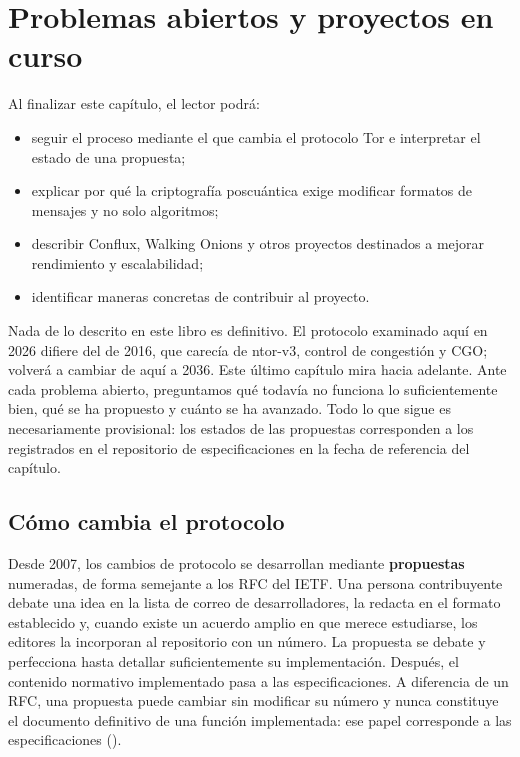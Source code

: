 \chapter{Problemas abiertos y proyectos en curso}\label{cap:31-futuro}

\begin{obiettivi}
Al finalizar este capítulo, el lector podrá:
\begin{itemize}[nosep]
  \item seguir el proceso mediante el que cambia el protocolo Tor e interpretar el estado de una propuesta;
  \item explicar por qué la criptografía poscuántica exige modificar formatos de mensajes y no solo algoritmos;
  \item describir Conflux, Walking Onions y otros proyectos destinados a mejorar rendimiento y escalabilidad;
  \item identificar maneras concretas de contribuir al proyecto.
\end{itemize}
\end{obiettivi}

Nada de lo descrito en este libro es definitivo. El protocolo examinado aquí en 2026 difiere del de 2016, que carecía de ntor-v3, control de congestión y CGO; volverá a cambiar de aquí a 2036. Este último capítulo mira hacia adelante. Ante cada problema abierto, preguntamos qué todavía no funciona lo suficientemente bien, qué se ha propuesto y cuánto se ha avanzado. Todo lo que sigue es necesariamente provisional: los estados de las propuestas corresponden a los registrados en el repositorio de especificaciones en la fecha de referencia del capítulo.

\section{Cómo cambia el protocolo}\label{sec:fut-processo}

Desde 2007, los cambios de protocolo se desarrollan mediante \textbf{propuestas} numeradas, de forma semejante a los RFC del IETF. Una persona contribuyente debate una idea en la lista de correo de desarrolladores, la redacta en el formato establecido y, cuando existe un acuerdo amplio en que merece estudiarse, los editores la incorporan al repositorio con un número. La propuesta se debate y perfecciona hasta detallar suficientemente su implementación. Después, el contenido normativo implementado pasa a las especificaciones. A diferencia de un RFC, una propuesta puede cambiar sin modificar su número y nunca constituye el documento definitivo de una función implementada: ese papel corresponde a las especificaciones ().

